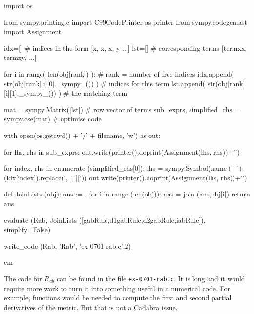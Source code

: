\documentclass[12pt]{cdblatex}
\begin{document}
\begin{cadabra}
      import os

      from sympy.printing.c import C99CodePrinter as printer
      from sympy.codegen.ast import Assignment

      idx=[]  # indices in the form [{x, x}, {x, y} ...]
      lst=[]  # corresponding terms [termxx, termxy, ...]

      for i in range( len(obj[rank]) ):                 # rank = number of free indices
          idx.append( str(obj[rank][i][0]._sympy_()) )  # indices for this term
          lst.append( str(obj[rank][i][1]._sympy_()) )  # the matching term

      mat = sympy.Matrix([lst])                         # row vector of terms
      sub_exprs, simplified_rhs = sympy.cse(mat)        # optimise code

      with open(os.getcwd() + '/' + filename, 'w') as out:

         for lhs, rhs in sub_exprs:
            out.write(printer().doprint(Assignment(lhs, rhs))+'\n')

         for index, rhs in enumerate (simplified_rhs[0]):
            lhs = sympy.Symbol(name+' '+(idx[index]).replace(', ',']['))
            out.write(printer().doprint(Assignment(lhs, rhs))+'\n')

   def JoinLists (obj):
      ans := {}.
      for i in range (len(obj)):
         ans = join (ans,obj[i])
      return ans

   evaluate   (Rab,  JoinLists ([gabRule,d1gabRule,d2gabRule,iabRule]), simplify=False)

   write_code (Rab, 'Rab', 'ex-0701-rab.c',2)

\end{cadabra}

 cm

The code for $R_{ab}$ can be found in the file {\tt ex-0701-rab.c}. It is long and it would require more
work to turn it into something useful in a numerical code. For example, functions would be needed to
compute the first and second partial derivatives of the metric. But that is not a Cadabra issue.
\end{document}
